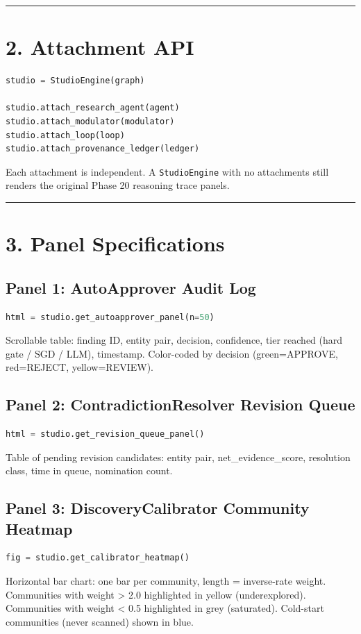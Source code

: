 \medskip\noindent\rule{\linewidth}{0.4pt}\medskip

\section*{2. Attachment API}

\begin{lstlisting}[language=Python]
studio = StudioEngine(graph)

studio.attach_research_agent(agent)
studio.attach_modulator(modulator)
studio.attach_loop(loop)
studio.attach_provenance_ledger(ledger)
\end{lstlisting}

Each attachment is independent. A \texttt{StudioEngine} with no attachments still renders the original Phase 20 reasoning trace panels.

\medskip\noindent\rule{\linewidth}{0.4pt}\medskip

\section*{3. Panel Specifications}

\subsection*{Panel 1: AutoApprover Audit Log}
\begin{lstlisting}[language=Python]
html = studio.get_autoapprover_panel(n=50)
\end{lstlisting}
Scrollable table: finding ID, entity pair, decision, confidence, tier reached (hard gate / SGD / LLM), timestamp. Color-coded by decision (green=APPROVE, red=REJECT, yellow=REVIEW).

\subsection*{Panel 2: ContradictionResolver Revision Queue}
\begin{lstlisting}[language=Python]
html = studio.get_revision_queue_panel()
\end{lstlisting}
Table of pending revision candidates: entity pair, net_evidence_score, resolution class, time in queue, nomination count.

\subsection*{Panel 3: DiscoveryCalibrator Community Heatmap}
\begin{lstlisting}[language=Python]
fig = studio.get_calibrator_heatmap()
\end{lstlisting}
Horizontal bar chart: one bar per community, length = inverse-rate weight. Communities with weight > 2.0 highlighted in yellow (underexplored). Communities with weight < 0.5 highlighted in grey (saturated). Cold-start communities (never scanned) shown in blue.

